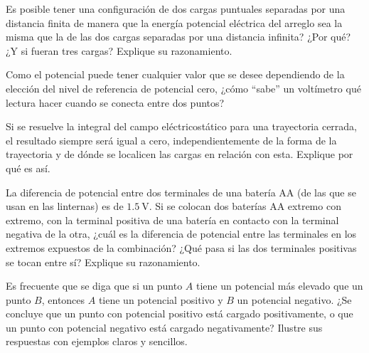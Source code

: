 %
\begin{Exercise}
    Es posible tener una configuración de dos cargas puntuales separadas por una distancia finita de manera que la energía potencial eléctrica del arreglo sea la misma que la de las dos cargas separadas por una distancia infinita? ¿Por qué? ¿Y si fueran tres cargas? Explique su razonamiento.
\end{Exercise}
%
\begin{Exercise}
    Como el potencial puede tener cualquier valor que se desee dependiendo de la elección del nivel de referencia de potencial cero, ¿cómo “sabe” un voltímetro qué lectura hacer cuando se conecta entre dos puntos?
\end{Exercise}
%
\begin{Exercise}
    Si se resuelve la integral del campo eléctricostático para una trayectoria cerrada, el resultado siempre será igual a cero, independientemente de la forma de la trayectoria y de dónde se localicen las cargas en relación con esta. Explique por qué es así.
\end{Exercise}
%
\begin{Exercise}
    La diferencia de potencial entre dos terminales de una batería AA (de las que se usan en las linternas) es de $\SI{1.5}{\volt}$. Si se colocan dos baterías AA extremo con extremo, con la terminal positiva de una batería en contacto con la terminal negativa de la otra, ¿cuál es la diferencia de potencial entre las terminales en los extremos expuestos de la combinación? ¿Qué pasa si las dos terminales positivas se tocan entre sí? Explique su razonamiento.
\end{Exercise}
%
\begin{Exercise}
    Es frecuente que se diga que si un punto $A$ tiene un potencial más elevado que un punto $B$, entonces $A$ tiene un potencial positivo y $B$ un potencial negativo. ¿Se concluye que un punto con potencial positivo está cargado positivamente, o que un punto con potencial negativo está cargado negativamente? Ilustre sus respuestas con ejemplos claros y sencillos.
\end{Exercise}
%